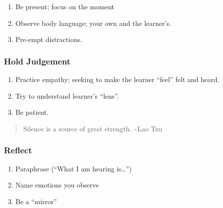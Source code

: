 \documentclass[
]{book}
\providecommand{\tightlist}{%
  \setlength{\itemsep}{0pt}\setlength{\parskip}{0pt}}
\begin{document}
\begin{enumerate}
\def\labelenumi{\arabic{enumi}.}
\tightlist
\item
  Be present; focus on the moment
\item
  Observe body language; your own and the learner's.
\item
  Pre-empt distractions.
\end{enumerate}

\hypertarget{hold-judgement}{%
\subsubsection*{Hold Judgement}\label{hold-judgement}}

\begin{enumerate}
\def\labelenumi{\arabic{enumi}.}
\tightlist
\item
  Practice empathy; seeking to make the learner ``feel'' felt and heard.
\item
  Try to understand learner's ``lens''.
\item
  Be patient.
\end{enumerate}

\begin{quote}
Silence is a source of great strength.
\textasciitilde Lao Tzu
\end{quote}

\hypertarget{reflect}{%
\subsubsection*{Reflect}\label{reflect}}

\begin{enumerate}
\def\labelenumi{\arabic{enumi}.}
\tightlist
\item
  Paraphrase (``What I am hearing is\ldots{}'')
\item
  Name emotions you observe
\item
  Be a ``mirror''
\end{enumerate}
\end{document}
